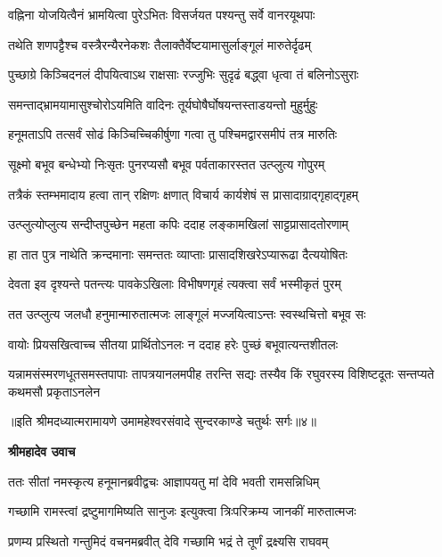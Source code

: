 \twolineshloka
{वह्निना योजयित्वैनं भ्रामयित्वा पुरेऽभितः}
{विसर्जयत पश्यन्तु सर्वे वानरयूथपाः} %

\twolineshloka
{तथेति शणपट्टैश्च वस्त्रैरन्यैरनेकशः}
{तैलाक्तैर्वेष्टयामासुर्लाङ्गूलं मारुतेर्दृढम्} %

\twolineshloka
{पुच्छाग्रे किञ्चिदनलं दीपयित्वाऽथ राक्षसाः}
{रज्जुभिः सुदृढं बद्ध्वा धृत्वा तं बलिनोऽसुराः} %

\twolineshloka
{समन्ताद्भ्रामयामासुश्चोरोऽयमिति वादिनः}
{तूर्यघोषैर्घोषयन्तस्ताडयन्तो मुहुर्मुहुः} %

\twolineshloka
{हनूमताऽपि तत्सर्वं सोढं किञ्चिच्चिकीर्षुणा}
{गत्वा तु पश्चिमद्वारसमीपं तत्र मारुतिः} %

\twolineshloka
{सूक्ष्मो बभूव बन्धेभ्यो निःसृतः पुनरप्यसौ}
{बभूव पर्वताकारस्तत उत्प्लुत्य गोपुरम्} %

\twolineshloka
{तत्रैकं स्तम्भमादाय हत्वा तान् रक्षिणः क्षणात्}
{विचार्य कार्यशेषं स प्रासादाग्राद्गृहाद्गृहम्} %

\twolineshloka
{उत्प्लुत्योप्लुत्य सन्दीप्तपुच्छेन महता कपिः}
{ददाह लङ्कामखिलां साट्टप्रासादतोरणाम्} %

\twolineshloka
{हा तात पुत्र नाथेति क्रन्दमानाः समन्ततः}
{व्याप्ताः प्रासादशिखरेऽप्यारूढा दैत्ययोषितः} %

\twolineshloka
{देवता इव दृश्यन्ते पतन्त्यः पावकेऽखिलाः}
{विभीषणगृहं त्यक्त्वा सर्वं भस्मीकृतं पुरम्} %

\twolineshloka
{तत उत्प्लुत्य जलधौ हनुमान्मारुतात्मजः}
{लाङ्गूलं मज्जयित्वाऽन्तः स्वस्थचित्तो बभूव सः} %

\twolineshloka
{वायोः प्रियसखित्वाच्च सीतया प्रार्थितोऽनलः}
{न ददाह हरेः पुच्छं बभूवात्यन्तशीतलः} %

\fourlineindentedshloka
{यन्नामसंस्मरणधूतसमस्तपापाः}
{तापत्रयानलमपीह तरन्ति सद्यः}
{तस्यैव किं रघुवरस्य विशिष्टदूतः}
{सन्तप्यते कथमसौ प्रकृताऽनलेन} %

{॥इति श्रीमदध्यात्मरामायणे उमामहेश्वरसंवादे सुन्दरकाण्डे
चतुर्थः सर्गः॥४॥
}




\textbf{श्रीमहादेव उवाच}

\twolineshloka
{ततः सीतां नमस्कृत्य हनूमानब्रवीद्वचः}
{आज्ञापयतु मां देवि भवती रामसन्निधिम्} %

\twolineshloka
{गच्छामि रामस्त्वां द्रष्टुमागमिष्यति सानुजः}
{इत्युक्त्वा त्रिःपरिक्रम्य जानकीं मारुतात्मजः} %

\twolineshloka
{प्रणम्य प्रस्थितो गन्तुमिदं वचनमब्रवीत्}
{देवि गच्छामि भद्रं ते तूर्णं द्रक्ष्यसि राघवम्} %

